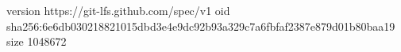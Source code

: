 version https://git-lfs.github.com/spec/v1
oid sha256:6e6db030218821015dbd3e4e9dc92b93a329c7a6fbfaf2387e879d01b80baa19
size 1048672
